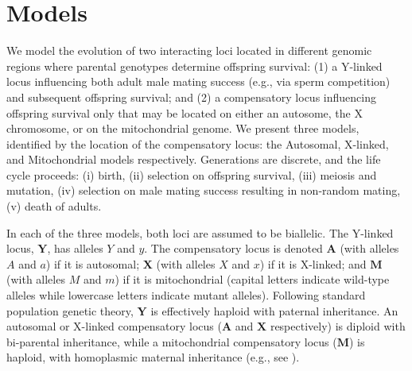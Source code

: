 \documentclass{article}
\begin{document}
\section{Models} \label{sec:Models}
We model the evolution of two interacting loci located in different genomic regions where parental genotypes determine offspring survival: (1) a Y-linked locus influencing both adult male mating success (e.g., via sperm competition) and subsequent offspring survival; and (2) a compensatory locus influencing offspring survival only that may be located on either an autosome, the X chromosome, or on the mitochondrial genome. We present three models, identified by the location of the compensatory locus: the Autosomal, X-linked, and Mitochondrial models respectively. Generations are discrete, and the life cycle proceeds: (i) birth, (ii) selection on offspring survival, (iii) meiosis and mutation, (iv) selection on male mating success resulting in non-random mating, (v) death of adults. 

In each of the three models, both loci are assumed to be biallelic. The Y-linked locus, $\mathbf{Y}$, has alleles $Y$ and $y$. The compensatory locus is denoted $\mathbf{A}$ (with alleles $A$ and $a$) if it is autosomal; $\mathbf{X}$ (with alleles $X$ and $x$) if it is X-linked; and $\mathbf{M}$ (with alleles $M$ and $m$) if it is mitochondrial (capital letters indicate wild-type alleles while lowercase letters indicate mutant alleles). Following standard population genetic theory, $\mathbf{Y}$ is effectively haploid with paternal inheritance. An autosomal or X-linked compensatory locus ($\mathbf{A}$ and $\mathbf{X}$ respectively) is diploid with bi-parental inheritance, while a mitochondrial compensatory locus ($\mathbf{M}$) is haploid, with homoplasmic maternal inheritance (e.g., see \citealt{FrankHurst1996,ConnallonDowling2017,Roze-etal2005}).
\end{document}
